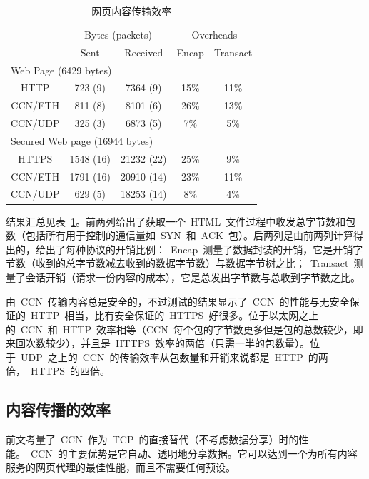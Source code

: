 {
\renewcommand{\arraystretch}{1.2}
\renewcommand{\tabcolsep}{0.2cm}
\begin{table}[htdp]
\begin{center}
\begin{tabular}{|c|c|c|c|c|}
\hline
\space & \multicolumn{2}{c|}{Bytes (packets)} & \multicolumn{2}{c|}{Overheads}  \\
\space & Sent & Received & Encap & Transact \\
\hline
\multicolumn{5}{|l|}{Web Page (6429 bytes)} \\
\hline
HTTP & 723 (9) & 7364 (9) & 15\% & 11\% \\
CCN/ETH & 811 (8) & 8101 (6) & 26\% & 13\% \\
CCN/UDP & 325 (3) & 6873 (5) & 7\% & 5\% \\
\hline
\multicolumn{5}{|l|}{Secured Web page (16944 bytes)} \\
\hline
HTTPS & 1548 (16) & 21232 (22) & 25\% & 9\% \\
CCN/ETH & 1791 (16) & 20910 (14) & 23\% & 11\% \\
CCN/UDP & 629 (5) & 18253 (14) & 8\% & 4\% \\
\hline
\end{tabular}
\caption{网页内容传输效率}
\label{web_performance}
\end{center}
\end{table}
}

结果汇总见表~\ref{web_performance}。前两列给出了获取一个~HTML~文件过程中收发总字节数和包数（包括所有用于控制的通信量如~SYN~和~ACK~包）。后两列是由前两列计算得出的，给出了每种协议的开销比例：~Encap~测量了数据封装的开销，它是开销字节数（收到的总字节数减去收到的数据字节数）与数据字节树之比；~Transact~测量了会话开销（请求一份内容的成本），它是总发出字节数与总收到字节数之比。

由~CCN~传输内容总是安全的，不过测试的结果显示了~CCN~的性能与无安全保证的~HTTP~相当，比有安全保证的~HTTPS~好很多。位于以太网之上的~CCN~和~HTTP~效率相等（CCN~每个包的字节数更多但是包的总数较少，即来回次数较少），并且是~HTTPS~效率的两倍（只需一半的包数量）。位于~UDP~之上的~CCN~的传输效率从包数量和开销来说都是~HTTP~的两倍，~HTTPS~的四倍。

\subsection{内容传播的效率}
\label{sec:6.2}
前文考量了~CCN~作为~TCP~的直接替代（不考虑数据分享）时的性能。~CCN~的主要优势是它自动、透明地分享数据。它可以达到一个为所有内容服务的网页代理的最佳性能，而且不需要任何预设。

